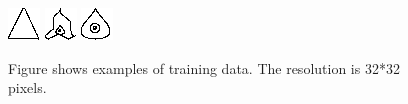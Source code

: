 \begin{figure}[p]
\vspace{1cm}

\centering
\includegraphics[width=.3\linewidth]{ext/ex/7.png}
\quad
\includegraphics[width=.3\linewidth]{ext/ex/8.png}
\quad
\includegraphics[width=.3\linewidth]{ext/ex/9.png}
\caption{Figure shows examples of training data. The resolution is 32*32 pixels. }
\label{fig:trainingExamples}
\end{figure}